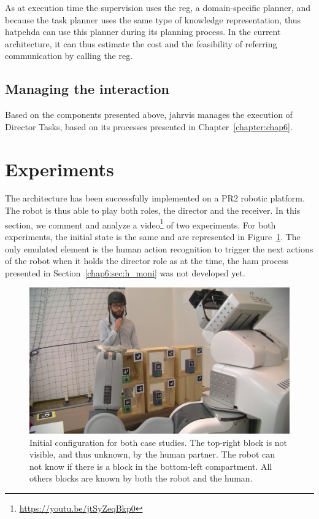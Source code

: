 \documentclass[a4paper,11pt,twoside]{StyleThese}
\begin{document}
As at execution time the supervision uses the \acrshort{reg}, a domain-specific planner, and because the task planner uses the same type of knowledge representation, thus \acrshort{hatpehda} can use this planner during its planning process. In the current architecture, it can thus estimate the cost and the feasibility of referring communication by calling the \acrshort{reg}.

\subsection{Managing the interaction}

Based on the components presented above, \acrshort{jahrvis} manages the execution of Director Tasks, based on its processes presented in Chapter~\ref{chapter:chap6}.


\section{Experiments}

The architecture has been successfully implemented on a PR2 robotic platform. The robot is thus able to play both roles, the director and the receiver. In this section, we comment and analyze a video\footnote{\url{https://youtu.be/jtSyZeqBkp0}} of two experiments. For both experiments, the initial state is the same and are represented in Figure~\ref{chap9:fig:expe_config}. The only emulated element is the human action recognition to trigger the next actions of the robot when it holds the director role as at the time, the \acrfull{ham} process presented in Section~\ref{chap6:sec:h_moni} was not developed yet.

\begin{figure}[ht!]
	\centering
	\includegraphics[width=\textwidth]{figures/chapter4/expe/config.png}
	\caption{\label{chap9:fig:expe_config} Initial configuration for both case studies. The top-right block is not visible, and thus unknown, by the human partner. The robot can not know if there is a block in the bottom-left compartment. All others blocks are known by both the robot and the human.}
\end{figure}
\end{document}
